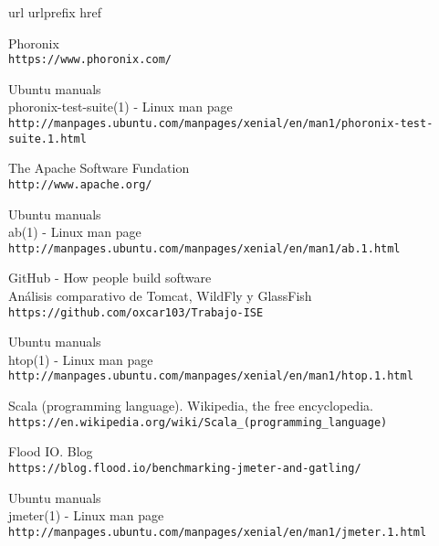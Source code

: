 \begin{thebibliography}{10}
\expandafter\ifx\csname url\endcsname\relax
  \def\url#1{\texttt{#1}}\fi
\expandafter\ifx\csname urlprefix\endcsname\relax\def\urlprefix{URL }\fi
\expandafter\ifx\csname href\endcsname\relax
  \def\href#1#2{#2} \def\path#1{#1}\fi

Phoronix\\
  \url{https://www.phoronix.com/}

Ubuntu manuals\\
phoronix-test-suite(1) - Linux man page\\
  \url{http://manpages.ubuntu.com/manpages/xenial/en/man1/phoronix-test-suite.1.html}

The Apache Software Fundation\\
  \url{http://www.apache.org/}

Ubuntu manuals\\
ab(1) - Linux man page\\
  \url{http://manpages.ubuntu.com/manpages/xenial/en/man1/ab.1.html}

GitHub - How people build software\\
Análisis comparativo de Tomcat, WildFly y GlassFish\\
  \url{https://github.com/oxcar103/Trabajo-ISE}

Ubuntu manuals\\
htop(1) - Linux man page\\
  \url{http://manpages.ubuntu.com/manpages/xenial/en/man1/htop.1.html}

Scala (programming language). Wikipedia, the free encyclopedia.\\
  \url{https://en.wikipedia.org/wiki/Scala_(programming_language)}

Flood IO. Blog\\
  \url{https://blog.flood.io/benchmarking-jmeter-and-gatling/}

Ubuntu manuals\\
jmeter(1) - Linux man page\\
  \url{http://manpages.ubuntu.com/manpages/xenial/en/man1/jmeter.1.html}

\end{thebibliography}
